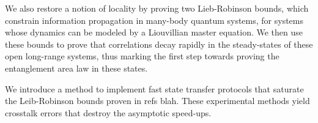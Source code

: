 We also restore a notion of locality by proving two Lieb-Robinson bounds, which constrain information propagation in many-body quantum systems, for systems whose dynamics can be modeled by a Liouvillian master equation. We then use these bounds to prove that correlations decay rapidly in the steady-states of these open long-range systems, thus marking the first step towards proving the entanglement area law in these states.

We introduce a method to implement fast state transfer protocols that saturate the Leib-Robinson bounds proven in refs {blah}. These experimental methods yield crosstalk errors that destroy the asymptotic speed-ups.
